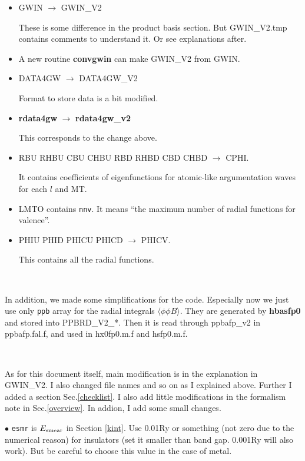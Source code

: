 \documentclass[a4paper,10pt,epsf,fleqn]{article}
\begin{document}
\begin{itemize}
\item
  {\sf GWIN} $\rightarrow$ {\sf GWIN\_V2}

  These is some difference in the product basis section.
  But {\sf GWIN\_V2.tmp} contains comments to understand it.
  Or see explanations after.

\item
  A new routine {\bf convgwin} can make {\sf GWIN\_V2} from {\sf GWIN}. 

\item
  {\sf DATA4GW} $\rightarrow$ {\sf DATA4GW\_V2}

  Format to store data is a bit modified.
\item
  {\bf rdata4gw} $\rightarrow$ {\bf rdata4gw\_v2}

   This corresponds to the change above.
\item
  {\sf RBU RHBU CBU CHBU RBD RHBD CBD CHBD } $\rightarrow$ {\sf CPHI}.

  It contains coefficients of eigenfunctions for atomic-like argumentation
  waves for each $l$ and MT.


\item
 {\sf LMTO} contains \verb#nnv#. 
 It means
 ``the maximum number of radial functions for valence''.

\item
  {\sf PHIU PHID PHICU PHICD} $\rightarrow$ {\sf PHICV}.

   This contains all the radial functions.
\end{itemize}

\ 

In addition, we made some simplifications for the code. 
Especially now we just use only \verb#ppb# array 
for the radial integrals $\langle \phi \phi B \rangle$.
They are generated by {\bf hbasfp0} and stored into
{\sf PPBRD\_V2\_*}. Then it is read through {\sf ppbafp\_v2} in 
{\sf ppbafp.fal.f}, and used in {\sf hx0fp0.m.f} and {\sf hsfp0.m.f}.

\ 

As for this document itself, main modification is
in the explanation in {\sf GWIN\_V2}.
I also changed file names and so on as I explained above.
Further I added a section Sec.\ref{checklist}.
I also add little modifications in the formalism note 
in Sec.\ref{overview}. In addion, I add some small changes.



\vspace{5mm}
\noindent $\bullet$ {\tt esmr} is $E_{\rm smear}$ in 
Section \ref{kint}. Use 0.01Ry or something
(not zero due to the numerical reason) for
insulators (set it smaller than band gap. 0.001Ry will also work).
But be careful to choose this value in the case of metal.
\end{document}
